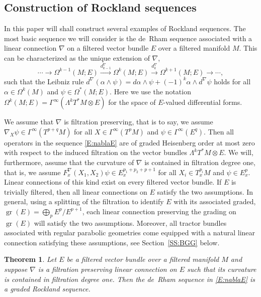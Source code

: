 \documentclass[reqno,12pt]{amsart}
\DeclareMathOperator{\gr}{gr}
\newcounter{ABC}
\theoremstyle{plain}
\newtheorem{thm}[ABC]{Theorem}
\theoremstyle{definition}
\begin{document}
\subsection{Construction of Rockland sequences}





In this paper will shall construct several examples of Rockland sequences.
The most basic sequence we will consider is the de~Rham sequence associated with a linear connection $\nabla$ on a filtered vector bundle $E$ over a filtered manifold $M$.
This can be characterized as the unique extension of $\nabla$,
\begin{equation}\label{E:nablaE}
\cdots\to\Omega^{k-1}(M;E)\xrightarrow{d_{k-1}^\nabla}\Omega^k(M;E)\xrightarrow{d_k^\nabla}\Omega^{k+1}(M;E)\to\cdots,
\end{equation}
such that the Leibniz rule $d^\nabla(\alpha\wedge\psi)=d\alpha\wedge\psi+(-1)^k\alpha\wedge d^\nabla\psi$ holds for all $\alpha\in\Omega^k(M)$ and $\psi\in\Omega^*(M;E)$.
Here we use the notation $\Omega^k(M;E)=\Gamma^\infty(\Lambda^kT^*M\otimes E)$ for the space of $E$-valued differential forms.


We assume that $\nabla$ is filtration preserving, that is to say, we assume $\nabla_X\psi\in\Gamma^\infty(T^{p+q}M)$ for all $X\in\Gamma^\infty(T^pM)$ and $\psi\in\Gamma^\infty(E^q)$.
Then all operators in the sequence \eqref{E:nablaE} are of graded Heisenberg order at most zero with respect to the induced filtration on the vector bundles $\Lambda^kT^*M\otimes E$.
We will, furthermore, assume that the curvature of $\nabla$ is contained in filtration degree one, that is, we assume $F^\nabla_x(X_1,X_2)\psi\in E_x^{p_1+p_2+p+1}$ for all $X_i\in T_x^{p_i}M$ and $\psi\in E^p_x$.
Linear connections of this kind exist on every filtered vector bundle.
If $E$ is trivially filtered, then all linear connections on $E$ satisfy the two assumptions.
In general, using a splitting of the filtration to identify $E$ with its associated graded, $\gr(E)=\bigoplus_pE^p/E^{p+1}$, each linear connection preserving the grading on $\gr(E)$ will satisfy the two assumptions.
Moreover, all tractor bundles associated with regular parabolic geometries come equipped with a natural linear connection satisfying these assumptions, see Section~\ref{SS:BGG} below.
 

\begin{thm}\label{thmB}
Let $E$ be a filtered vector bundle over a filtered manifold $M$ and suppose $\nabla$ is a filtration preserving linear connection on $E$ such that its curvature is contained in filtration degree one.
Then the de~Rham sequence in \eqref{E:nablaE} is a graded Rockland sequence.
\end{thm}
\end{document}
